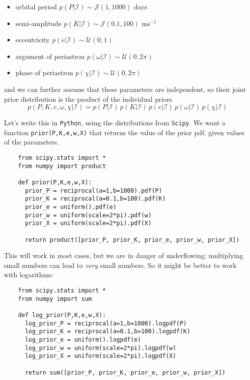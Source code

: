 \documentclass[a4paper,11pt]{article}
\begin{document}
  \begin{itemize}
    \item[] orbital period         \hfill $p(P|\mathcal{I}) \sim \mathcal{J}(1, 1000)$ days
    \item[] semi-amplitude         \hfill $p(K|\mathcal{I}) \sim \mathcal{J}(0.1, 100)$ ms$^{-1}$
    \item[] eccentricity           \hfill $p(e|\mathcal{I}) \sim \mathcal{U}(0, 1)$
    \item[] argument of periastron \hfill $p(\omega|\mathcal{I}) \sim \mathcal{U}(0, 2\pi)$
    \item[] phase of periastron    \hfill $p(\chi|\mathcal{I}) \sim \mathcal{U}(0, 2\pi)$
  \end{itemize}
  and we can further assume that these parameters are independent, so their joint prior distribution
  is the product of the individual priors
  \begin{equation}
    p(P,K,e,\omega,\chi|\mathcal{I}) = p(P|\mathcal{I}) \, p(K|\mathcal{I}) \, p(e|\mathcal{I}) \, p(\omega|\mathcal{I}) \, p(\chi|\mathcal{I})
  \end{equation}

  Let's write this in \texttt{Python}, using the distributions from \texttt{Scipy}.
  We want a function \texttt{prior(P,K,e,w,X)} that returns the value of the prior pdf, given values of the parameters.

  \begin{verbatim}
    from scipy.stats import *
    from numpy import product

    def prior(P,K,e,w,X):
      prior_P = reciprocal(a=1,b=1000).pdf(P)
      prior_K = reciprocal(a=0.1,b=100).pdf(K)
      prior_e = uniform().pdf(e)
      prior_w = uniform(scale=2*pi).pdf(w)
      prior_X = uniform(scale=2*pi).pdf(X)

      return product([prior_P, prior_K, prior_e, prior_w, prior_X])
  \end{verbatim}


  This will work in most cases, but we are in danger of underflowing: multiplying small numbers can lead to \emph{very} small numbers.
  So it might be better to work with logarithms:
  \begin{verbatim}
    from scipy.stats import *
    from numpy import sum

    def log_prior(P,K,e,w,X):
      log_prior_P = reciprocal(a=1,b=1000).logpdf(P)
      log_prior_K = reciprocal(a=0.1,b=100).logpdf(K)
      log_prior_e = uniform().logpdf(e)
      log_prior_w = uniform(scale=2*pi).logpdf(w)
      log_prior_X = uniform(scale=2*pi).logpdf(X)

      return sum([prior_P, prior_K, prior_e, prior_w, prior_X])
  \end{verbatim}
\end{document}

